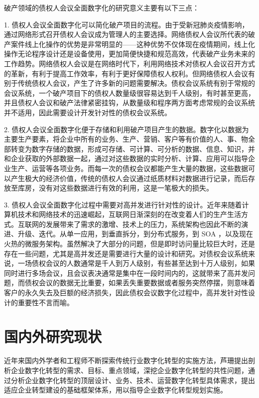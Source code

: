 破产领域的债权人会议全面数字化的研究意义主要有以下三点：

1. 债权人会议全面数字化可以简化破产项目的流程。由于受新冠肺炎疫情影响，通过网络形式召开债权人会议成为管理人的主要选择。网络债权人会议所代表的破产案件线上化操作的优势是非常明显的——这种优势不仅体现在疫情期间，线上化操作无论程序设计还是设备使用，更加简便快捷和规范高效，代表破产业务未来的工作趋势。网络债权人会议是在网络时代下，利用网络技术对债权人会议召开方式的革新，有利于提高工作效率，有利于更好保障债权人权利。但网络债权人会议有别于传统债权人会议，产生了许多新的问题需要解决。债权会议系统有别于常规的会议系统，一个破产项目下的债权人数量级很容易达到千人级别，有时甚至更高，并且债权人会议和破产法律紧密挂钩，从数量级和程序两方面考虑常规的会议系统并不适用，因此需要设计开发针对性的债权会议系统。

2. 债权人会议全面数字化便于存储和利用破产项目产生的数据。数字化以数据为主要生产要素，将企业中所有的业务、生产、营销、客户等有价值的人、事、物全部转变为数字存储的数据，形成可存储、可计算、可分析的数据、信息、知识，并和企业获取的外部数据一起，通过对这些数据的实时分析、计算、应用可以指导企业生产、运营等各项业务。而每一次的债权会议都能产生大量的数据，这些数据可以产生极大的经济价值，传统的债权人会议通过纸质材料对数据进行记录，而后存放至库房，没有对这些数据进行有效的利用，这是一笔极大的损失。

3. 债权人会议全面数字化过程中需要对高并发进行针对性的设计。近年来随着计算机技术和网络技术的迅速崛起，互联网日渐深刻的在改变着人们的生产生活方式。互联网的发展带来了需求的激增、技术上的压力，系统架构也因此不断的演进、升级、迭代。从单一应用，到垂直拆分，到分布式服务，到 SOA ，以及现在火热的微服务架构。虽然解决了大部分的问题，但是即时访问量比较巨大时，还是存在一些问题，尤其是高并发还是需要进行大量的设计和研究。对债权会议系统来说，一场债权会议的人数通常是千人到万人级别，有些甚至达到十万人级别，如果同时进行多场会议，且会议表决通常是集中在一段时间内的，这就带来了高并发问题，而债权会议的数据无比重要，如果丢失重要数据或者服务突然停摆，则意味着客户的永久失去及巨额的经济损失，因此债权会议数字化过程中，高并发针对性设计的重要性不言而喻。

\section{国内外研究现状}
近年来国内外学者和工程师不断探索传统行业数字化转型的实施方法，芦珊\cite{Li1999}提出剖析企业数字化转型的需求、目标、重点领域，深挖企业数字化转型的共性问题，通过分析企业数字化转型的顶层设计、业务、技术、运营数字化转型具体需求，提出适应企业转型建设的基础框架体系，用以指导企业数字化转型规划实施。

